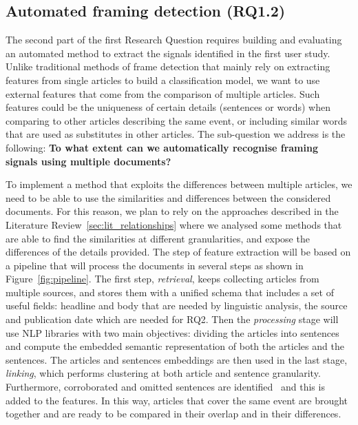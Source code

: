 \subsection{Automated framing detection (RQ1.2)}

The second part of the first Research Question requires building and evaluating an automated method to extract the signals identified in the first user study.
Unlike traditional methods of frame detection that mainly rely on extracting features from single articles to build a classification model, we want to use external features that come from the comparison of multiple articles. Such features could be the uniqueness of certain details (sentences or words) when comparing to other articles describing the same event, or including similar words that are used as substitutes in other articles.
The sub-question we address is the following:
\textbf{To what extent can we automatically recognise framing signals using multiple documents?}

To implement a method that exploits the differences between multiple articles, we need to be able to use the similarities and differences between the considered documents.
For this reason, we plan to rely on the approaches described in the Literature Review~\ref{sec:lit_relationships} where we analysed some methods that are able to find the similarities at different granularities, and expose the differences of the details provided.
The step of feature extraction will be based on a pipeline that will process the documents in several steps as shown in Figure~\ref{fig:pipeline}.
The first step, \emph{retrieval}, keeps collecting articles from multiple sources, and stores them with a unified schema that includes a set of useful fields: headline and body that are needed by linguistic analysis, the source and publication date which are needed for RQ2.
Then the \emph{processing} stage will use NLP libraries with two main objectives: dividing the articles into sentences and compute the embedded semantic representation of both the articles and the sentences.
The articles and sentences embeddings are then used in the last stage, \emph{linking}, which performs clustering at both article and sentence granularity. Furthermore, corroborated and omitted sentences are identified~\cite{bountouridis2018explaining} and this is added to the features.
In this way, articles that cover the same event are brought together and are ready to be compared in their overlap and in their differences.

